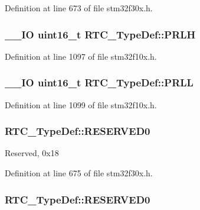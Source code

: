 Definition at line 673 of file stm32f30x.\-h.

\hypertarget{struct_r_t_c___type_def_a831b0b55bae7921faa7d16c6f3160449}{
\subsubsection[{P\-R\-L\-H}]{\setlength{\rightskip}{0pt plus 5cm}\-\_\-\-\_\-\-I\-O {\bf uint16\-\_\-t} R\-T\-C\-\_\-\-Type\-Def\-::\-P\-R\-L\-H}}\label{struct_r_t_c___type_def_a831b0b55bae7921faa7d16c6f3160449}


Definition at line 1097 of file stm32f10x.\-h.

\hypertarget{struct_r_t_c___type_def_a03cf96aff11c288096d30a66afd19899}{
\subsubsection[{P\-R\-L\-L}]{\setlength{\rightskip}{0pt plus 5cm}\-\_\-\-\_\-\-I\-O {\bf uint16\-\_\-t} R\-T\-C\-\_\-\-Type\-Def\-::\-P\-R\-L\-L}}\label{struct_r_t_c___type_def_a03cf96aff11c288096d30a66afd19899}


Definition at line 1099 of file stm32f10x.\-h.

\hypertarget{struct_r_t_c___type_def_a150d3ec74c7a8884d87bc15b9e878055}{
\subsubsection[{R\-E\-S\-E\-R\-V\-E\-D0}]{ R\-T\-C\-\_\-\-Type\-Def\-::\-R\-E\-S\-E\-R\-V\-E\-D0}}\label{struct_r_t_c___type_def_a150d3ec74c7a8884d87bc15b9e878055}
Reserved, 0x18 

Definition at line 675 of file stm32f30x.\-h.

\hypertarget{struct_r_t_c___type_def_a6d55bb337c409f849725a774364ce3bc}{
\subsubsection[{R\-E\-S\-E\-R\-V\-E\-D0}]{ R\-T\-C\-\_\-\-Type\-Def\-::\-R\-E\-S\-E\-R\-V\-E\-D0}}\label{struct_r_t_c___type_def_a6d55bb337c409f849725a774364ce3bc}


